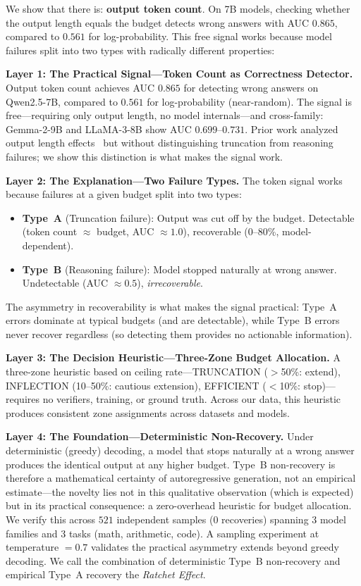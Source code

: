 \documentclass{article}
\begin{document}
We show that there is: \textbf{output token count}. On 7B models, checking whether the output length equals the budget detects wrong answers with AUC $0.865$, compared to $0.561$ for log-probability. This free signal works because model failures split into two types with radically different properties:

\textbf{Layer 1: The Practical Signal---Token Count as Correctness Detector.}
Output token count achieves AUC $0.865$ for detecting wrong answers on Qwen2.5-7B, compared to $0.561$ for log-probability (near-random). The signal is free---requiring only output length, no model internals---and cross-family: Gemma-2-9B and LLaMA-3-8B show AUC $0.699$--$0.731$. Prior work analyzed output length effects~\cite{concisethoughts2024} but without distinguishing truncation from reasoning failures; we show this distinction is what makes the signal work.

\textbf{Layer 2: The Explanation---Two Failure Types.}
The token signal works because failures at a given budget split into two types:
\begin{itemize}
    \item \textbf{Type~A} (Truncation failure): Output was cut off by the budget. Detectable (token count $\approx$ budget, AUC $\approx 1.0$), recoverable (0--80\%, model-dependent).
    \item \textbf{Type~B} (Reasoning failure): Model stopped naturally at wrong answer. Undetectable (AUC $\approx 0.5$), \emph{irrecoverable}.
\end{itemize}
The asymmetry in recoverability is what makes the signal practical: Type~A errors dominate at typical budgets (and are detectable), while Type~B errors never recover regardless (so detecting them provides no actionable information).

\textbf{Layer 3: The Decision Heuristic---Three-Zone Budget Allocation.}
A three-zone heuristic based on ceiling rate---TRUNCATION ($>$50\%: extend), INFLECTION (10--50\%: cautious extension), EFFICIENT ($<$10\%: stop)---requires no verifiers, training, or ground truth. Across our data, this heuristic produces consistent zone assignments across datasets and models.

\textbf{Layer 4: The Foundation---Deterministic Non-Recovery.}
Under deterministic (greedy) decoding, a model that stops naturally at a wrong answer produces the identical output at any higher budget. Type~B non-recovery is therefore a mathematical certainty of autoregressive generation, not an empirical estimate---the novelty lies not in this qualitative observation (which is expected) but in its practical consequence: a zero-overhead heuristic for budget allocation. We verify this across $521$ independent samples (0 recoveries) spanning 3 model families and 3 tasks (math, arithmetic, code). A sampling experiment at temperature $= 0.7$ validates the practical asymmetry extends beyond greedy decoding. We call the combination of deterministic Type~B non-recovery and empirical Type~A recovery the \emph{Ratchet Effect}.
\end{document}
